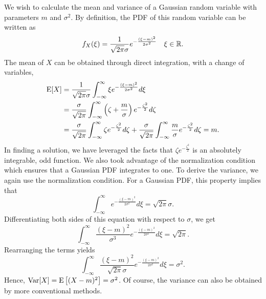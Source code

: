 \begin{example}
We wish to calculate the mean and variance of a Gaussian random variable with parameters $m$ and $\sigma^2$.
By definition, the PDF of this random variable can be written as
\begin{equation*}
f_X (\xi) = \frac{1}{\sqrt{2 \pi} \sigma} e^{-\frac{(\xi - m)^2}{2\sigma^2}}
\quad \xi \in \mathbb{R} .
\end{equation*}
The mean of $X$ can be obtained through direct integration, with a change of variables,
\begin{equation*}
\begin{split}
\mathrm{E} [X]
&= \frac{1}{\sqrt{2 \pi} \sigma} \int_{- \infty}^{\infty} \xi e^{-\frac{(\xi-m)^2}{2\sigma^2}} d\xi \\
&= \frac{\sigma}{\sqrt{2 \pi}} \int_{- \infty}^{\infty}
\left( \zeta+\frac{m}{\sigma} \right) e^{-\frac{\zeta^2}{2}} d\zeta \\
&= \frac{\sigma}{\sqrt{2 \pi}} \int_{- \infty}^{\infty}
\zeta e^{-\frac{\zeta^2}{2}} d\zeta
+ \frac{\sigma}{\sqrt{2 \pi}} \int_{- \infty}^{\infty}
\frac{m}{\sigma} e^{-\frac{\zeta^2}{2}} d\zeta
= m.
\end{split}
\end{equation*}
In finding a solution, we have leveraged the facts that $\zeta e^{-\frac{\zeta^2}{2}}$ is an absolutely integrable, odd function.
We also took advantage of the normalization condition which ensures that a Gaussian PDF integrates to one.
To derive the variance, we again use the normalization condition.
For a Gaussian PDF, this property implies that
\begin{equation*}
\int_{-\infty}^{\infty} e^{- \frac{(\xi-m)^2}{2 \sigma^2}} d\xi
= \sqrt{2 \pi} \sigma .
\end{equation*}
Differentiating both sides of this equation with respect to $\sigma$, we get
\begin{equation*}
\int_{-\infty}^{\infty} \frac{(\xi-m)^2}{\sigma^3}
e^{- \frac{(\xi-m)^2}{2 \sigma^2}} d\xi
= \sqrt{2 \pi} .
\end{equation*}
Rearranging the terms yields
\begin{equation*}
\int_{-\infty}^{\infty} \frac{(\xi-m)^2}{\sqrt{2 \pi} \sigma}
e^{- \frac{(\xi-m)^2}{2 \sigma^2}} d\xi
= \sigma^2 .
\end{equation*}
Hence, $\mathrm{Var} [X] = \mathrm{E} \left[ (X-m)^2 \right] = \sigma^2$.
Of course, the variance can also be obtained by more conventional methods.
\end{example}


